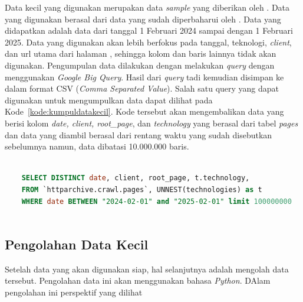 Data kecil yang digunakan merupakan data \textit{sample} yang diberikan oleh \http. Data yang digunakan berasal dari data yang sudah diperbaharui oleh \http. Data yang didapatkan adalah data dari tanggal 1 Februari 2024 sampai dengan 1 Februari 2025. Data yang digunakan akan lebih berfokus pada tanggal, teknologi, \textit{client}, dan url utama dari halaman \web, sehingga kolom dan baris lainnya tidak akan digunakan. Pengumpulan data dilakukan dengan melakukan \textit{query} dengan menggunakan \textit{Google Big Query}. Hasil dari \textit{query} tadi kemudian disimpan ke dalam format CSV (\textit{Comma Separated Value}). Salah satu query yang dapat digunakan untuk mengumpulkan data dapat dilihat pada Kode~\ref{kode:kumpuldatakecil}. Kode tersebut akan mengembalikan data yang berisi kolom \textit{date, client, root\_page}, dan \textit{technology} yang berasal dari tabel \textit{pages} dan data yang diambil berasal dari rentang waktu yang sudah disebutkan sebelumnya namun, data dibatasi 10.000.000 baris.

\begin{lstlisting}[language=SQL, caption=Kode untuk mengumpulkan data kecil, label=kode:kumpuldatakecil]

    SELECT DISTINCT date, client, root_page, t.technology,  
    FROM `httparchive.crawl.pages`, UNNEST(technologies) as t 
    WHERE date BETWEEN "2024-02-01" and "2025-02-01" limit 100000000
    
\end{lstlisting}

\subsection{Pengolahan Data Kecil}
\label{subsec:pengolahankecil}
Setelah data yang akan digunakan siap, hal selanjutnya adalah mengolah data tersebut. Pengolahan data ini akan menggunakan bahasa \textit{Python}. DAlam pengolahan ini perspektif yang dilihat 

